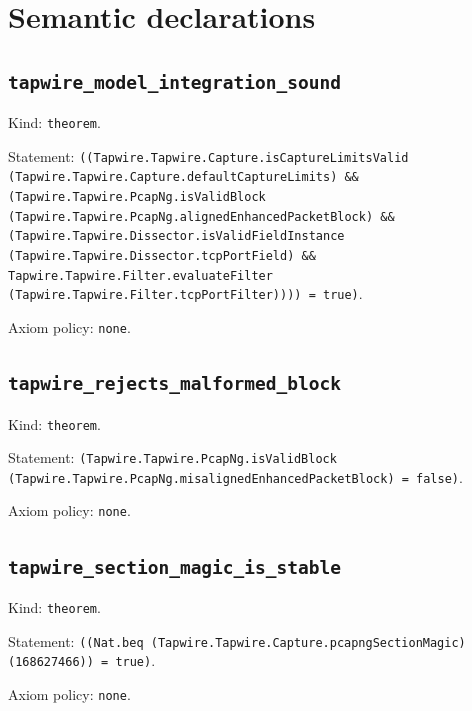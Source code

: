 \documentclass[11pt]{article}
\begin{document}
\section*{Semantic declarations}
\subsection*{\texttt{tapwire\_model\_integration\_sound}}
\noindent Kind: \texttt{theorem}.\par
\noindent Statement: \texttt{((Tapwire.Tapwire.Capture.isCaptureLimitsValid (Tapwire.Tapwire.Capture.defaultCaptureLimits) \&\& (Tapwire.Tapwire.PcapNg.isValidBlock (Tapwire.Tapwire.PcapNg.alignedEnhancedPacketBlock) \&\& (Tapwire.Tapwire.Dissector.isValidFieldInstance (Tapwire.Tapwire.Dissector.tcpPortField) \&\& Tapwire.Tapwire.Filter.evaluateFilter (Tapwire.Tapwire.Filter.tcpPortFilter)))) = true)}.\par
\noindent Axiom policy: \texttt{none}.\par
\subsection*{\texttt{tapwire\_rejects\_malformed\_block}}
\noindent Kind: \texttt{theorem}.\par
\noindent Statement: \texttt{(Tapwire.Tapwire.PcapNg.isValidBlock (Tapwire.Tapwire.PcapNg.misalignedEnhancedPacketBlock) = false)}.\par
\noindent Axiom policy: \texttt{none}.\par
\subsection*{\texttt{tapwire\_section\_magic\_is\_stable}}
\noindent Kind: \texttt{theorem}.\par
\noindent Statement: \texttt{((Nat.beq (Tapwire.Tapwire.Capture.pcapngSectionMagic) (168627466)) = true)}.\par
\noindent Axiom policy: \texttt{none}.\par
\end{document}
